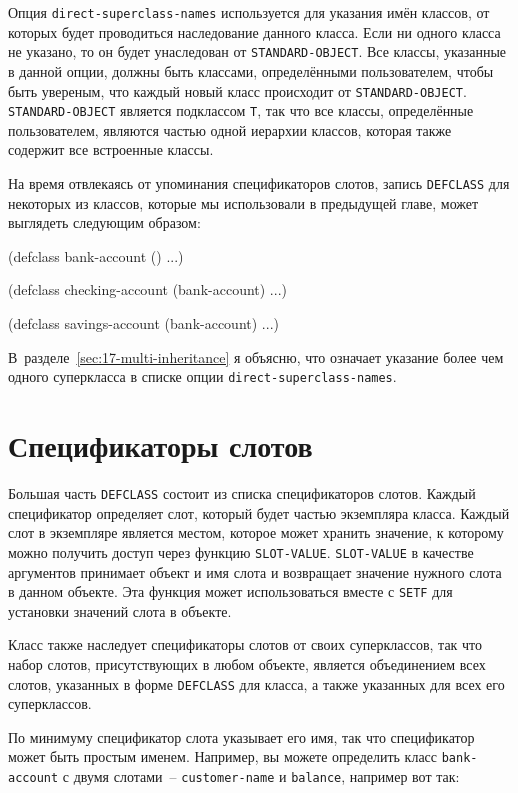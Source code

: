 Опция \lstinline{direct-superclass-names} используется для указания имён классов, от которых
будет проводиться наследование данного класса.  Если ни одного класса не указано, то он
будет унаследован от \lstinline{STANDARD-OBJECT}.  Все классы, указанные в данной опции, должны
быть классами, определёнными пользователем, чтобы быть увереным, что каждый новый класс
происходит от \lstinline{STANDARD-OBJECT}.  \lstinline{STANDARD-OBJECT} является подклассом
\lstinline{T}, так что все классы, определённые пользователем, являются частью одной иерархии
классов, которая также содержит все встроенные классы.

На время отвлекаясь от упоминания спецификаторов слотов, запись \lstinline{DEFCLASS} для
некоторых из классов, которые мы использовали в предыдущей главе, может выглядеть
следующим образом:

\begin{myverb}
(defclass bank-account () ...)

(defclass checking-account (bank-account) ...)

(defclass savings-account (bank-account) ...)
\end{myverb}

В~разделе~\ref{sec:17-multi-inheritance} я объясню, что означает указание более чем одного
суперкласса в списке опции \lstinline{direct-superclass-names}.

\section{Спецификаторы слотов}

Большая часть \lstinline{DEFCLASS} состоит из списка спецификаторов слотов.  Каждый
спецификатор определяет слот, который будет частью экземпляра класса.  Каждый слот в
экземпляре является местом, которое может хранить значение, к которому можно получить
доступ через функцию \lstinline{SLOT-VALUE}. \lstinline{SLOT-VALUE} в качестве аргументов принимает
объект и имя слота и возвращает значение нужного слота в данном объекте.  Эта функция
может использоваться вместе с \lstinline{SETF} для установки значений слота в объекте.

Класс также наследует спецификаторы слотов от своих суперклассов, так что набор слотов,
присутствующих в любом объекте, является объединением всех слотов, указанных в форме
\lstinline{DEFCLASS} для класса, а также указанных для всех его суперклассов.

По минимуму спецификатор слота указывает его имя, так что спецификатор может быть простым
именем.  Например, вы можете определить класс \lstinline{bank-account} с двумя слотами~--
\lstinline{customer-name} и \lstinline{balance}, например вот так:

